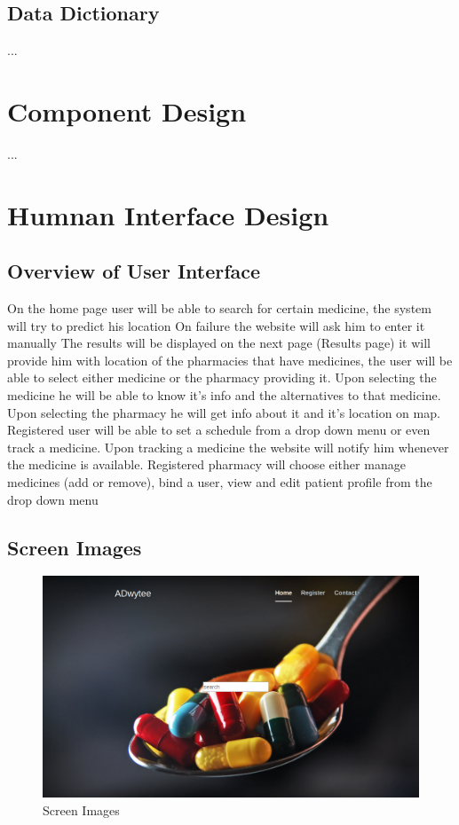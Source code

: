 \documentclass[]{article}
\begin{document}
\subsection {Data Dictionary}
...

\section{Component Design}
...


\section{Humnan Interface Design}

\subsection {Overview of User Interface}
On the home page user will be able to search for certain medicine, the system will try to predict his location
\newline
On failure the website will ask him to enter it manually
\newline
The results will be displayed on the next page (Results page) it will provide him with location of the pharmacies that have medicines, the user will be able to select either medicine or the pharmacy providing it.
\newline
Upon selecting the medicine he will be able to know it's info and the alternatives to that medicine.
\newline
Upon selecting the pharmacy he will get info about it and it's location on map.
\newline
\newline
Registered user will be able to set a schedule from a drop down menu or even track a medicine.
\newline
Upon tracking a medicine the website will notify him whenever the medicine is available.
\newline
\newline
Registered pharmacy will choose either manage medicines (add or remove), bind a user, view and edit patient profile from the drop down menu
\newline

\subsection {Screen Images}

\begin{figure}[tbh]
\centering
\includegraphics[width=0.5\linewidth]{./Home}
\caption{Screen Images}
\label{fig:image}
\end{figure}
\end{document}
